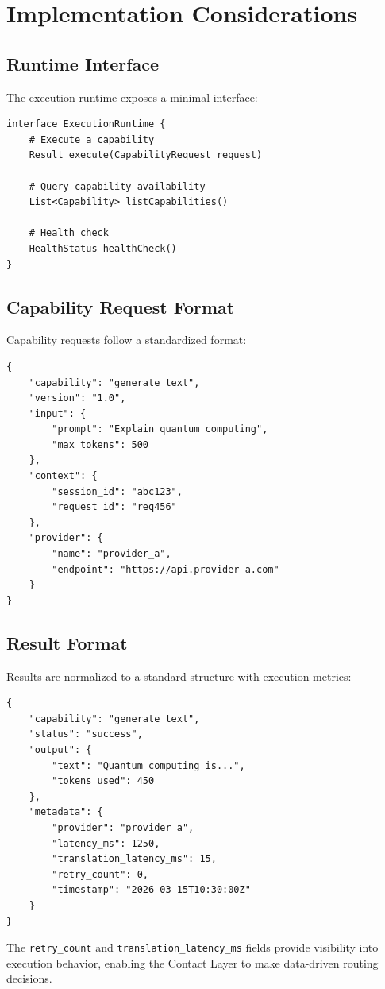 \section{Implementation Considerations}

\subsection{Runtime Interface}

The execution runtime exposes a minimal interface:

\begin{lstlisting}[style=pythonstyle]
interface ExecutionRuntime {
    # Execute a capability
    Result execute(CapabilityRequest request)

    # Query capability availability
    List<Capability> listCapabilities()

    # Health check
    HealthStatus healthCheck()
}
\end{lstlisting}

\subsection{Capability Request Format}

Capability requests follow a standardized format:

\begin{lstlisting}[style=jsonstyle]
{
    "capability": "generate_text",
    "version": "1.0",
    "input": {
        "prompt": "Explain quantum computing",
        "max_tokens": 500
    },
    "context": {
        "session_id": "abc123",
        "request_id": "req456"
    },
    "provider": {
        "name": "provider_a",
        "endpoint": "https://api.provider-a.com"
    }
}
\end{lstlisting}

\subsection{Result Format}

Results are normalized to a standard structure with execution metrics:

\begin{lstlisting}[style=jsonstyle]
{
    "capability": "generate_text",
    "status": "success",
    "output": {
        "text": "Quantum computing is...",
        "tokens_used": 450
    },
    "metadata": {
        "provider": "provider_a",
        "latency_ms": 1250,
        "translation_latency_ms": 15,
        "retry_count": 0,
        "timestamp": "2026-03-15T10:30:00Z"
    }
}
\end{lstlisting}

The \texttt{retry\_count} and \texttt{translation\_latency\_ms} fields provide visibility into execution behavior, enabling the Contact Layer to make data-driven routing decisions.
